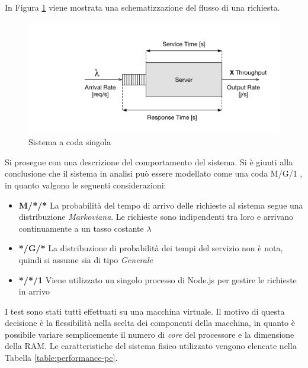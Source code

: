 In Figura \ref{fig:sistema-coda} viene mostrata una schematizzazione del flusso di una richiesta.

\begin{figure}[ht]
	\centering
	\includegraphics[width=\textwidth]{7-performance/Immagini/sistema_coda.png}
	\caption{Sistema a coda singola}\label{fig:sistema-coda}
\end{figure}

Si prosegue con una descrizione del comportamento del sistema. Si è giunti alla conclusione che il sistema in analisi può essere modellato come una coda M/G/1 \cite{sundarapandian2009probability}, in quanto valgono le seguenti considerazioni:

\begin{itemize}
	\item \textbf{M/*/*}
	La probabilità del tempo di arrivo delle richieste al sistema segue una distribuzione \emph{Markoviana}. Le richieste sono indipendenti tra loro e arrivano continuamente a un tasso costante $ \lambda $
	\item \textbf{*/G/*}
	La distribuzione di probabilità dei tempi del servizio non è nota, quindi si assume sia di tipo \emph{Generale}
	\item \textbf{*/*/1}
	Viene utilizzato un singolo processo di Node.js per gestire le richieste in arrivo
\end{itemize}

I test sono stati tutti effettuati su una macchina virtuale. Il motivo di questa decisione è la flessibilità nella scelta dei componenti della macchina, in quanto è possibile variare semplicemente il numero di \emph{core} del processore e la dimensione della RAM. Le caratteristiche del sistema fisico utilizzato vengono elencate nella Tabella \ref{table:performance-pc}.

